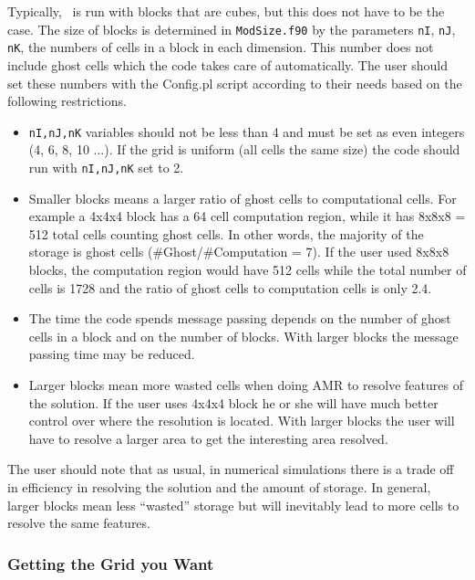Typically, \BATSRUS\ is run with blocks that are cubes, 
but this does not have to be the case.  
The size of blocks is determined in {\tt ModSize.f90} by the parameters 
{\tt nI}, {\tt nJ}, {\tt nK}, the numbers of cells in a block
in each dimension.  This number does not include ghost cells which the code
takes care of automatically.  The user should set these numbers with the 
Config.pl script according to their needs based on the following restrictions.
\begin{itemize}
\item {\tt nI,nJ,nK} variables should not be less than 4 and must be set as even
      integers (4, 6, 8, 10 ...). If the grid is uniform (all cells the same size)
      the code should run with {\tt nI,nJ,nK} set to 2.
\item Smaller blocks means a larger ratio of ghost cells to computational cells.
      For example a 4x4x4 block has a 64 cell computation region, while
      it has 8x8x8 = 512 total cells counting ghost cells.  In other words,
      the majority of the storage is ghost cells (\#Ghost/\#Computation = 7).
      If the user used 8x8x8 blocks, the computation region would have 512 
      cells while the total number of cells is 1728 and the ratio of ghost cells
      to computation cells is only 2.4.
\item The time the code spends message passing depends on the number of
      ghost cells in a block and on the number of blocks.  With larger blocks
      the message passing time may be reduced.
\item Larger blocks mean more wasted cells when doing AMR to resolve
      features of the solution.  If the user uses 4x4x4 block he or she will
      have much better control over where the resolution is located.  With larger
      blocks the user will have to resolve a larger area to get the interesting
      area resolved.
\end{itemize}
The user should note that as usual, in numerical simulations there is a trade off
in efficiency in resolving the solution and the amount of storage.  In general,
larger blocks mean less ``wasted'' storage but will inevitably lead to more cells
to resolve the same features.

\subsubsection{Getting the Grid you Want \label{section:proc_dims}}

